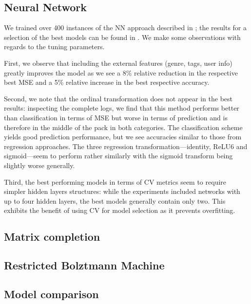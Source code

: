 \documentclass[bj, preprint]{imsart}
\begin{document}



\subsection{Neural Network}\label{sebsec:results.nn}

We trained over 400 instances of the NN approach described in ; the results for a selection of the best models can be found in . We make some observations with regards to the tuning parameters.

First, we observe that including the external features (genre, tags, user info) greatly improves the model as we see a 8\% relative reduction in the respective best MSE and a 5\% relative increase in the best respective accuracy. 

Second, we note that the ordinal transformation does not appear in the best results: inspecting the complete logs, we find that this method performs better than classification in terms of MSE but worse in terms of prediction and is therefore in the middle of the pack in both categories. The classification scheme yields good prediction performance, but we see accuracies similar to those from regression approaches. The three regression transformation---identity, ReLU6 and sigmoid---seem to perform rather similarly with the sigmoid transform being slightly worse generally.

Third, the best performing models in terms of CV metrics seem to require simpler hidden layers structures: while the experiments included networks with up to four hidden layers, the best models generally contain only two. This exhibits the benefit of using CV for model selection as it prevents overfitting.





\subsection{Matrix completion}\label{sebsec:results.svd}


\subsection{Restricted Bolztmann Machine}\label{sebsec:results.rbm}


\subsection{Model comparison}\label{sebsec:results.model}





{}
\end{document}
